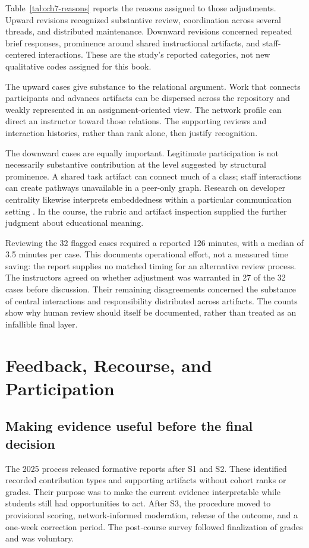 Table~\ref{tab:ch7-reasons} reports the reasons assigned to those adjustments. Upward revisions recognized substantive review, coordination across several threads, and distributed maintenance. Downward revisions concerned repeated brief responses, prominence around shared instructional artifacts, and staff-centered interactions. These are the study's reported categories, not new qualitative codes assigned for this book.



The upward cases give substance to the relational argument. Work that connects participants and advances artifacts can be dispersed across the repository and weakly represented in an assignment-oriented view. The network profile can direct an instructor toward those relations. The supporting reviews and interaction histories, rather than rank alone, then justify recognition.

The downward cases are equally important. Legitimate participation is not necessarily substantive contribution at the level suggested by structural prominence. A shared task artifact can connect much of a class; staff interactions can create pathways unavailable in a peer-only graph. Research on developer centrality likewise interprets embeddedness within a particular communication setting \citep{maruping2019}. In the course, the rubric and artifact inspection supplied the further judgment about educational meaning.

Reviewing the 32 flagged cases required a reported 126 minutes, with a median of 3.5 minutes per case. This documents operational effort, not a measured time saving: the report supplies no matched timing for an alternative review process. The instructors agreed on whether adjustment was warranted in 27 of the 32 cases before discussion. Their remaining disagreements concerned the substance of central interactions and responsibility distributed across artifacts. The counts show why human review should itself be documented, rather than treated as an infallible final layer.

\section{Feedback, Recourse, and Participation}
\label{sec:ch7-feedback}

\subsection{Making evidence useful before the final decision}
The 2025 process released formative reports after S1 and S2. These identified recorded contribution types and supporting artifacts without cohort ranks or grades. Their purpose was to make the current evidence interpretable while students still had opportunities to act. After S3, the procedure moved to provisional scoring, network-informed moderation, release of the outcome, and a one-week correction period. The post-course survey followed finalization of grades and was voluntary.

